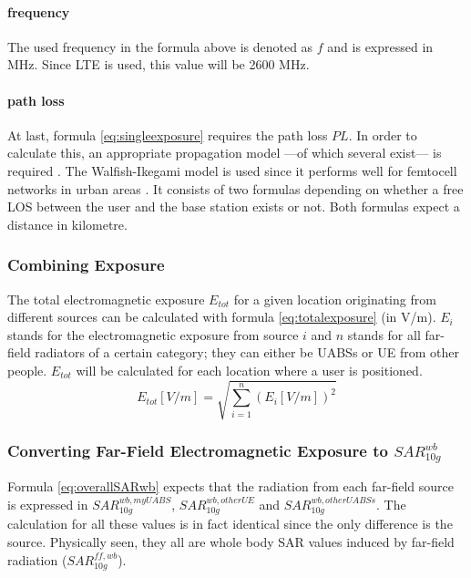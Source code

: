 \paragraph{frequency}
The used frequency in the formula above is denoted as $f$ and is expressed in MHz. Since LTE is used, this value will be 2600 MHz.

\paragraph{path loss}
\label{subsec:pl}
At last, formula \ref{eq:singleexposure} requires the path loss $PL$. In order to calculate this, an appropriate propagation model ---of which several exist--- is required .
The Walfish-Ikegami model is used since it performs well for femtocell networks in urban areas \cite{J2}. %
It consists of two formulas depending on whether a free \gls{LOS} between the user and the base station exists or not. Both formulas expect a distance in kilometre. %

\subsubsection{Combining Exposure}
The total electromagnetic exposure $E_{tot}$ for a given location originating from different sources can be calculated with formula \ref{eq:totalexposure} (in V/m). $E_i$ stands for 
the electromagnetic exposure from source $i$ and
$n$ stands for all far-field radiators of a certain category; they can either be \gls{UABS}s or \gls{UE} from other people.
$E_{tot}$ will be calculated for each location where a user is positioned.  
\begin{equation}
E_{tot} [V/m] = \sqrt{\sum_{i=1}^{n} (E_i [V/m]) ^2}
\label{eq:totalexposure}
\end{equation}

\subsubsection{Converting Far-Field Electromagnetic Exposure to $SAR^{wb}_{10g}$}
\label{sub:convertDLtosarwb}

Formula \ref{eq:overallSARwb} expects that the radiation from each far-field source is expressed in $SAR^{wb,myUABS}_{10g}$, $SAR^{wb,otherUE}_{10g}$ and $SAR^{wb,otherUABSs}_{10g}$. The 
calculation for all these values is in fact identical since the only difference is the source.
Physically seen, they all are whole body SAR values induced by far-field radiation ($SAR^{ff,wb}_{10g}$).

